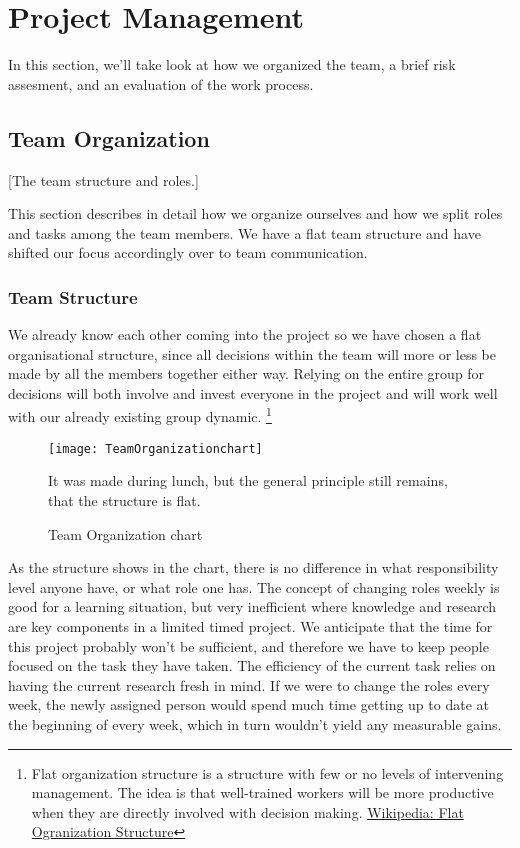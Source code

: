\section{Project Management}\label{management} 
    In this section, we'll take look at how we organized the team, a brief risk assesment, and an evaluation of the work process. 
    
    \subsection{Team Organization}\label{team} 
        [The team structure and roles.]
        
        This section describes in detail how we organize ourselves and how we split roles and tasks among the team members. We have a flat team structure and have shifted our focus accordingly over to team communication. 
    
    \subsubsection{Team Structure}
    We already know each other coming into the project so we have chosen a flat organisational structure, since all decisions within the team will more or less be made by all the members together either way. Relying on the entire group for decisions will both involve and invest everyone in the project and will work well with our already existing group dynamic.
    \footnote{
        Flat organization structure is a structure with few or no levels of intervening management. The idea is that well-trained workers will be more productive when they are directly involved with decision making. 
        \href{http://en.wikipedia.org/wiki/Flat_organization}{Wikipedia: Flat Ogranization Structure} 
    }
    
    \begin{figure}[h]
        \centering
        \texttt{[image: TeamOrganizationchart]}
        \caption{Team Organization chart}
        It was made during lunch, but the general principle still remains, that the structure is flat.
        \label{fig:teamOrgchart}
    \end{figure}
    
    As the structure shows in the chart, there is no difference in what responsibility level anyone have, or what role one has. The concept of changing roles weekly is good for a learning situation, but very inefficient where knowledge and research are key components in a limited timed project. We anticipate that the time for this project probably won't be sufficient, and therefore we have to keep people focused on the task they have taken. The efficiency of the current task relies on having the current research fresh in mind. If we were to change the roles every week, the newly assigned person would spend much time getting up to date at the beginning of every week, which in turn wouldn't yield any measurable gains. 

